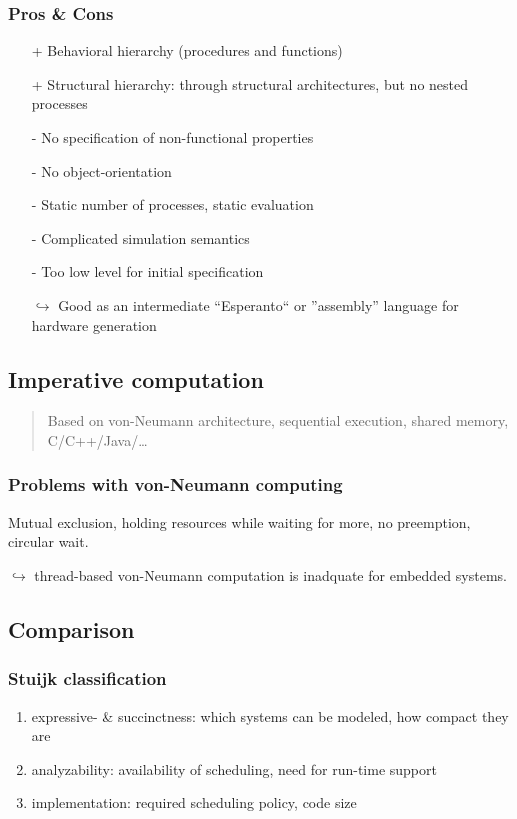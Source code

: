 \documentclass{article}
\begin{document}
\subsubsection{Pros \& Cons}
\begin{itemize}
  \item[+] Behavioral hierarchy (procedures and functions)
  \item[+] Structural hierarchy: through structural architectures, but no nested processes
  \item[-] No specification of non-functional properties
  \item[-] No object-orientation
  \item[-] Static number of processes, static evaluation
  \item[-] Complicated simulation semantics
  \item[-] Too low level for initial specification
  \item[$\hookrightarrow$] Good as an intermediate “Esperanto“ or ”assembly” language for hardware generation
\end{itemize}

\subsection{Imperative computation}
\begin{quote}Based on von-Neumann architecture, sequential execution, shared memory, C/C++/Java/…\end{quote}

\subsubsection{Problems with von-Neumann computing}
Mutual exclusion, holding resources while waiting for more, no preemption, circular wait.
\par $\hookrightarrow$ thread-based von-Neumann computation is inadquate for embedded systems.

\subsection{Comparison}


\subsubsection{Stuijk classification}
\begin{enumerate}
  \item expressive- \& succinctness: which systems can be modeled, how compact they are
  \item analyzability: availability of scheduling, need for run-time support
  \item implementation: required scheduling policy, code size
\end{enumerate}
\end{document}
